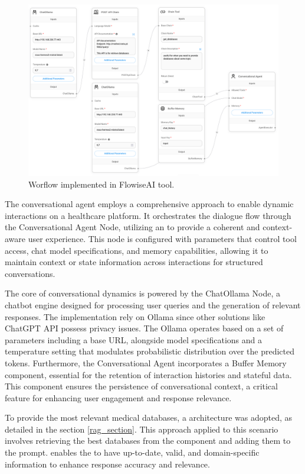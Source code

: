 \begin{figure}[H]
    \includegraphics[width=\textwidth]{figs/chapter3/workflow.png}
    \centering
    \caption{Worflow implemented in FlowiseAI tool.}
    \label{fig_workflow}
\end{figure}


The conversational agent employs a comprehensive approach to enable dynamic interactions on a healthcare {\ir} platform. It orchestrates the dialogue flow through the Conversational Agent Node, utilizing an {\llm} to provide a coherent and context-aware user experience. This node is configured with parameters that control tool access, chat model specifications, and memory capabilities, allowing it to maintain context or state information across interactions for structured conversations.

The core of conversational dynamics is powered by the ChatOllama Node, a chatbot engine designed for processing user queries and the generation of relevant responses. The implementation rely on Ollama since other solutions like ChatGPT API possess privacy issues. The Ollama operates based on a set of parameters including a base URL, alongside model specifications and a temperature setting that modulates probabilistic distribution over the predicted tokens. Furthermore, the Conversational Agent incorporates a Buffer Memory component, essential for the retention of interaction histories and stateful data. This component ensures the persistence of conversational context, a critical feature for enhancing user engagement and response relevance.

To provide the most relevant medical databases, a {\rag} architecture was adopted, as detailed in the section \ref{rag_section}. This approach applied to this scenario involves retrieving the best databases from the {\ir} component and adding them to the {\llm} prompt. {\rag} enables the {\llm} to have up-to-date, valid, and domain-specific information to enhance response accuracy and relevance. 

